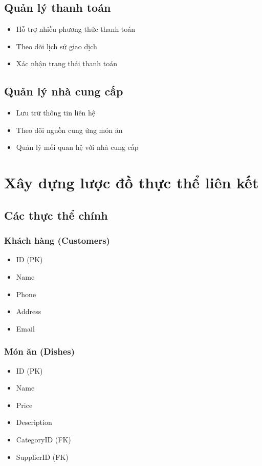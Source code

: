 \documentclass{article}
\begin{document}
\subsection{Quản lý thanh toán}
\begin{itemize}
    \item Hỗ trợ nhiều phương thức thanh toán
    \item Theo dõi lịch sử giao dịch
    \item Xác nhận trạng thái thanh toán
\end{itemize}

\subsection{Quản lý nhà cung cấp}
\begin{itemize}
    \item Lưu trữ thông tin liên hệ
    \item Theo dõi nguồn cung ứng món ăn
    \item Quản lý mối quan hệ với nhà cung cấp
\end{itemize}

\section{Xây dựng lược đồ thực thể liên kết}

\subsection{Các thực thể chính}

\subsubsection{Khách hàng (Customers)}

\begin{itemize}
    \item ID (PK)
    \item Name
    \item Phone
    \item Address
    \item Email
\end{itemize}

\subsubsection{Món ăn (Dishes)}

\begin{itemize}
    \item ID (PK)
    \item Name
    \item Price
    \item Description
    \item CategoryID (FK)
    \item SupplierID (FK)
\end{itemize}
\end{document}
